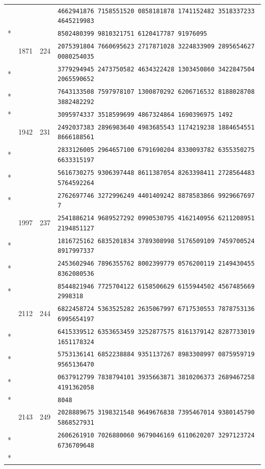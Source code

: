 \documentclass[10pt]{article}
\begin{document}
\begin{longtable}{@{}r@{\quad}r@{\quad}r@{\quad}l@{}}
 & &  & \texttt{4662941876 7158551520 0858181878 1741152482 3518337233 4645219983}\\*
 & &  & \texttt{8502480399 9810321751 6120417787 91976095}\\
\addlinespace[2pt]
56 & 1871 & 224 & \texttt{2075391804 7660695623 2717871028 3224833909 2895654627 0080254035}\\*
 & &  & \texttt{3779294945 2473750582 4634322428 1303450860 3422847504 2065590652}\\*
 & &  & \texttt{7643133508 7597978107 1300870292 6206716532 8188028708 3882482292}\\*
 & &  & \texttt{3095974337 3518599699 4867324864 1690396975 1492}\\
\addlinespace[2pt]
57 & 1942 & 231 & \texttt{2492037383 2896983640 4983685543 1174219238 1884654551 8666188561}\\*
 & &  & \texttt{2833126005 2964657100 6791690204 8330093782 6355350275 6633315197}\\*
 & &  & \texttt{5616730275 9306397448 8611387054 8263398411 2728564483 5764592264}\\*
 & &  & \texttt{2762697746 3272996249 4401409242 8878583866 9929667697 7}\\
\addlinespace[2pt]
58 & 1997 & 237 & \texttt{2541886214 9689527292 0990530795 4162140956 6211208951 2194851127}\\*
 & &  & \texttt{1816725162 6835201834 3789308998 5176509109 7459700524 8917997337}\\*
 & &  & \texttt{2453602946 7896355762 8002399779 0576200119 2149430455 8362080536}\\*
 & &  & \texttt{8544821946 7725704122 6158506629 6155944502 4567485669 2998318}\\
\addlinespace[2pt]
59 & 2112 & 244 & \texttt{6822458724 5363525282 2635067997 6717530553 7878753136 6995654197}\\*
 & &  & \texttt{6415339512 6353653459 3252877575 8161379142 8287733019 1651178324}\\*
 & &  & \texttt{5753136141 6852238884 9351137267 8983308997 0875959719 9565136470}\\*
 & &  & \texttt{0637912799 7838794101 3935663871 3810206373 2689467258 4191362058}\\*
 & &  & \texttt{8048}\\
\addlinespace[2pt]
60 & 2143 & 249 & \texttt{2028889675 3198321548 9649676838 7395467014 9380145790 5868527931}\\*
 & &  & \texttt{2606261910 7026880060 9679046169 6110620207 3297123724 6736709648}\\*

\end{longtable}
\end{document}
